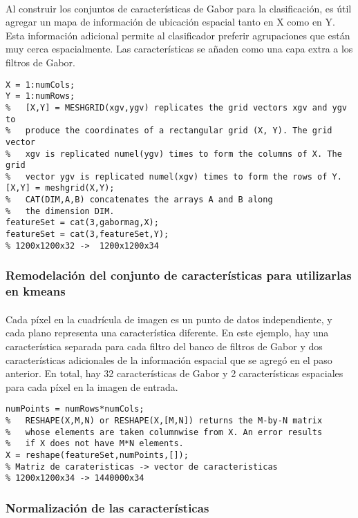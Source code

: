 \documentclass[es,gi]{ifirak}\usepackage[]{graphicx}\usepackage[]{color}
\begin{document}
\paragraph{}Al construir los conjuntos de características de Gabor para la clasificación, es útil agregar un mapa de información de ubicación espacial tanto en X como en Y. Esta información adicional permite al clasificador preferir agrupaciones que están muy cerca espacialmente. Las características se añaden como una capa extra a los filtros de Gabor.
\begin{lstlisting}
X = 1:numCols;
Y = 1:numRows;
%   [X,Y] = MESHGRID(xgv,ygv) replicates the grid vectors xgv and ygv to 
%   produce the coordinates of a rectangular grid (X, Y). The grid vector
%   xgv is replicated numel(ygv) times to form the columns of X. The grid 
%   vector ygv is replicated numel(xgv) times to form the rows of Y.
[X,Y] = meshgrid(X,Y);
%   CAT(DIM,A,B) concatenates the arrays A and B along
%   the dimension DIM.  
featureSet = cat(3,gabormag,X);
featureSet = cat(3,featureSet,Y);
% 1200x1200x32 ->  1200x1200x34
\end{lstlisting}

\subsubsection{Remodelación del conjunto de características para utilizarlas en kmeans}
\paragraph{} Cada píxel en la cuadrícula de imagen es un punto de datos independiente, y cada plano representa una característica diferente. En este ejemplo, hay una característica separada para cada filtro del banco de filtros de Gabor y dos características adicionales de la información espacial que se agregó en el paso anterior. En total, hay 32 características de Gabor y 2 características espaciales para cada píxel en la imagen de entrada.
\begin{lstlisting}
numPoints = numRows*numCols;
%   RESHAPE(X,M,N) or RESHAPE(X,[M,N]) returns the M-by-N matrix 
%   whose elements are taken columnwise from X. An error results 
%   if X does not have M*N elements.
X = reshape(featureSet,numPoints,[]);
% Matriz de carateristicas -> vector de caracteristicas
% 1200x1200x34 -> 1440000x34
\end{lstlisting}

\subsubsection{Normalización de las características}
\end{document}
